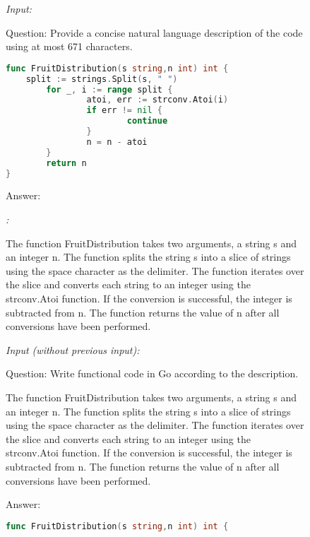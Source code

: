 \begin{figure}[htbp]
\hrulefill

\emph{Input:}

\hrulefill

Question: Provide a concise natural language description of the code using at most 671 characters.
\begin{lstlisting}[language=Go,breaklines=true,basicstyle=\ttfamily\scriptsize]
func FruitDistribution(s string,n int) int {
    split := strings.Split(s, " ")
        for _, i := range split {
                atoi, err := strconv.Atoi(i)
                if err != nil {
                        continue
                }
                n = n - atoi
        }
        return n
}
\end{lstlisting}

Answer: 

\hrulefill

\emph{\model{}:}

\hrulefill

The function FruitDistribution takes two arguments, a string s and an integer n. The function splits the string s into a slice of strings using the space character as the delimiter. The function iterates over the slice and converts each string to an integer using the strconv.Atoi function. If the conversion is successful, the integer is subtracted from n. The function returns the value of n after all conversions have been performed.

\hrulefill

\emph{Input (without previous input):}

\hrulefill

Question: Write functional code in Go according to the description.

The function FruitDistribution takes two arguments, a string s and an integer n. The function splits the string s into a slice of strings using the space character as the delimiter. The function iterates over the slice and converts each string to an integer using the strconv.Atoi function. If the conversion is successful, the integer is subtracted from n. The function returns the value of n after all conversions have been performed.

Answer:
\begin{lstlisting}[language=Go,breaklines=true,basicstyle=\ttfamily\scriptsize]
func FruitDistribution(s string,n int) int {
\end{lstlisting}

\hrulefill


\end{figure}
